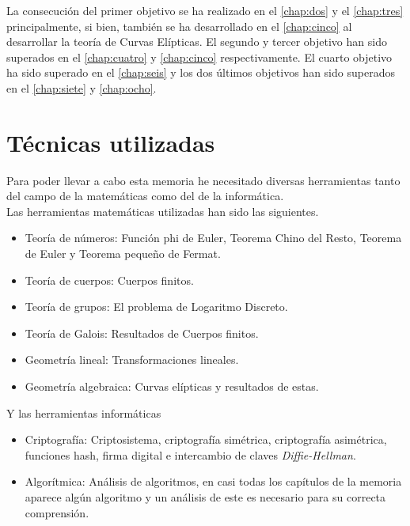 La consecución del primer objetivo se ha realizado en el \autoref{chap:dos} y el \autoref{chap:tres} principalmente, si bien, también se ha desarrollado en el \autoref{chap:cinco} al desarrollar la teoría de Curvas Elípticas. El segundo y tercer objetivo han sido superados en el \autoref{chap:cuatro} y \autoref{chap:cinco} respectivamente. El cuarto objetivo ha sido superado en el \autoref{chap:seis} y los dos últimos objetivos han sido superados en el \autoref{chap:siete} y \autoref{chap:ocho}.

\section{Técnicas utilizadas}
Para poder llevar a cabo esta memoria he necesitado diversas herramientas tanto del campo de la matemáticas como del de la informática.\\ 
Las herramientas matemáticas utilizadas han sido las siguientes.
\begin{itemize}
	\item Teoría de números: Función phi de Euler, Teorema Chino del Resto, Teorema de Euler y Teorema pequeño de Fermat.
	\item Teoría de cuerpos: Cuerpos finitos.
	\item Teoría de grupos: El problema de Logaritmo Discreto. 
	\item Teoría de Galois: Resultados de Cuerpos finitos.
	\item Geometría lineal: Transformaciones lineales.
	\item Geometría algebraica: Curvas elípticas y resultados de estas.
\end{itemize}

Y las herramientas informáticas
\begin{itemize}
	\item Criptografía: Criptosistema, criptografía simétrica, criptografía asimétrica, funciones hash, firma digital e intercambio de claves \emph{Diffie-Hellman}. 
	\item Algorítmica: Análisis de algoritmos, en casi todas los capítulos de la memoria aparece algún algoritmo y un análisis de este es necesario para su correcta comprensión.
\end{itemize}

		
